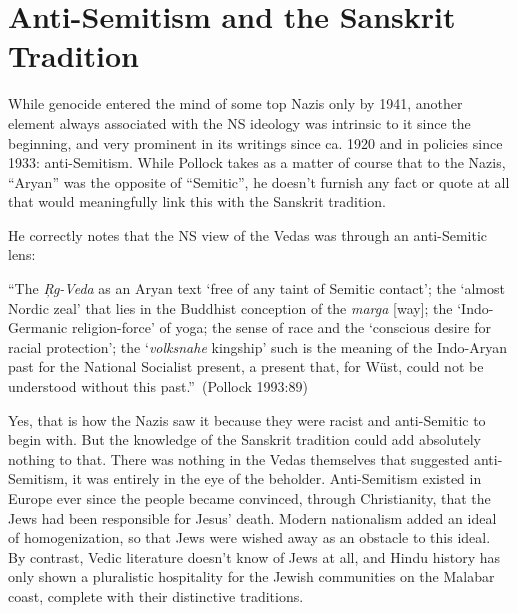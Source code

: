 \section*{Anti-Semitism and the Sanskrit Tradition}

While genocide entered the mind of some top Nazis only by 1941, another element always associated with the NS ideology was intrinsic to it since the beginning, and very prominent in its writings since ca. 1920 and in policies since 1933: anti-Semitism. While Pollock takes as a matter of course that to the Nazis, “Aryan” was the opposite of “Semitic”, he doesn’t furnish any fact or quote at all that would meaningfully link this with the Sanskrit tradition.

He correctly notes that the NS view of the Vedas was through an anti-Semitic lens: 
\begin{myquote}
“The {\sl Ŗg-Veda} as an Aryan text ‘free of any taint of Semitic contact’; the ‘almost Nordic zeal’ that lies in the Buddhist conception of the {\sl marga} [way]; the ‘Indo-Germanic religion-force’ of yoga; the sense of race and the ‘conscious desire for racial protection’; the ‘{\sl volksnahe} kingship’ such is the meaning of the Indo-Aryan past for the National Socialist present, a present that, for Wüst, could not be understood without this past.”~\hfill(Pollock 1993:89)
\end{myquote}

Yes, that is how the Nazis saw it because they were racist and anti-Semitic to begin with. But the knowledge of the Sanskrit tradition could add absolutely nothing to that. There was nothing in the Vedas themselves that suggested anti-Semitism, it was entirely in the eye of the beholder. Anti-Semitism existed in Europe ever since the people became convinced, through Christianity, that the Jews had been responsible for Jesus’ death. Modern nationalism added an ideal of homogenization, so that Jews were wished away as an obstacle to this ideal. By contrast, Vedic literature doesn’t know of Jews at all, and Hindu history has only shown a pluralistic hospitality for the Jewish communities on the Malabar coast, complete with their distinctive traditions.

